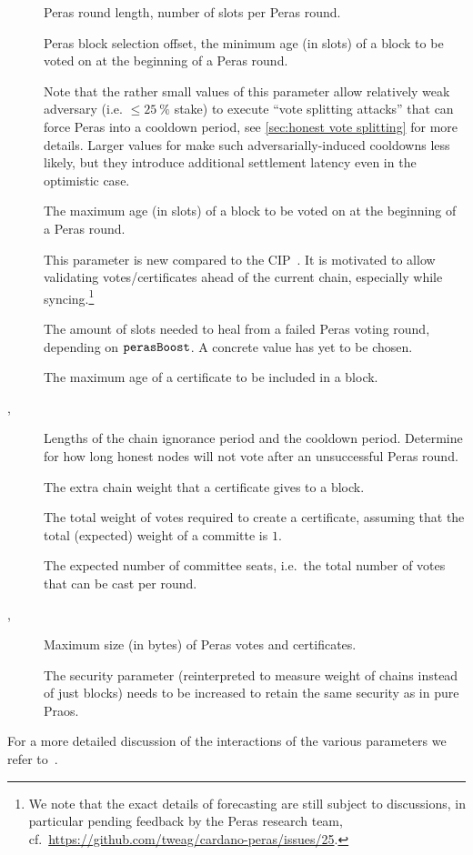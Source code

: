 \begin{description}
\item[\perasRoundSlots]
  Peras round length, number of slots per Peras round.
\item[\perasBlockMinSlots]
  Peras block selection offset, the minimum age (in slots) of a block to be voted on at the beginning of a Peras round.

  Note that the rather small values of this parameter allow relatively weak adversary (i.e. $\le \qty{25}{\percent}$ stake) to execute \enquote{vote splitting attacks} that can force Peras into a cooldown period, see \cref{sec:honest vote splitting} for more details.
  Larger values for \perasBlockMinSlots{} make such adversarially-induced cooldowns less likely, but they introduce additional settlement latency even in the optimistic case.
\item[\perasBlockMaxSlots]
  The maximum age (in slots) of a block to be voted on at the beginning of a Peras round.

  This parameter is new compared to the CIP~\cite{peras-cip}.
  It is motivated to allow validating votes/certificates ahead of the current chain, especially while syncing.\footnote{
  We note that the exact details of forecasting are still subject to discussions, in particular pending feedback by the Peras research team, cf.~\url{https://github.com/tweag/cardano-peras/issues/25}.}
\item[\perasHealingSlots]
  The amount of slots needed to heal from a failed Peras voting round, depending on $\mathtt{perasBoost}$.
  A concrete value has yet to be chosen.
\item[\perasCertMaxRounds]
  The maximum age of a certificate to be included in a block.
\item[\perasIgnoranceRounds, \perasCooldownRounds]
  Lengths of the chain ignorance period and the cooldown period.
  Determine for how long honest nodes will not vote after an unsuccessful Peras round.
\item[\perasBoost]
  The extra chain weight that a certificate gives to a block.
\item[\perasQuorum]
  The total weight of votes required to create a certificate, assuming that the total (expected) weight of a committe is $1$.
\item[\perasN]
  The expected number of committee seats, i.e.\ the total number of votes that can be cast per round.
\item[\perasVoteSizeLimit, \perasCertSizeLimit]
  Maximum size (in bytes) of Peras votes and certificates.
\item[\kcp]
  The security parameter (reinterpreted to measure weight of chains instead of just blocks) needs to be increased to retain the same security as in pure Praos.
\end{description}

For a more detailed discussion of the interactions of the various parameters we refer to~\cite{peras-cip}.

